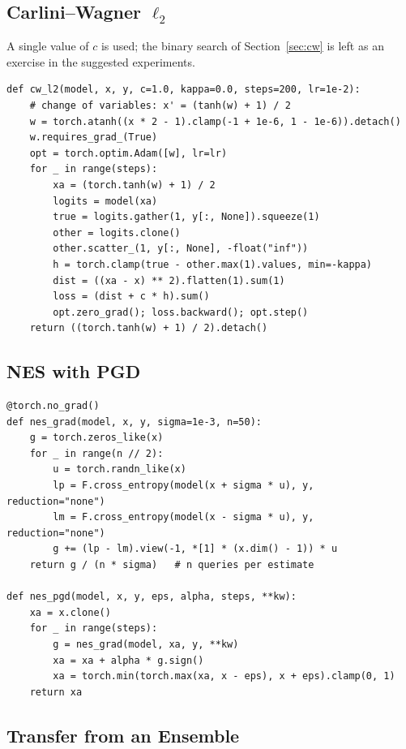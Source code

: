 \documentclass[10pt,a4paper]{extarticle}
\theoremstyle{definition}
\begin{document}
\subsection{Carlini--Wagner \(\ell_2\)}

A single value of \(c\) is used; the binary search of Section~\ref{sec:cw} is left as an exercise in the suggested experiments.

\begin{lstlisting}
def cw_l2(model, x, y, c=1.0, kappa=0.0, steps=200, lr=1e-2):
    # change of variables: x' = (tanh(w) + 1) / 2
    w = torch.atanh((x * 2 - 1).clamp(-1 + 1e-6, 1 - 1e-6)).detach()
    w.requires_grad_(True)
    opt = torch.optim.Adam([w], lr=lr)
    for _ in range(steps):
        xa = (torch.tanh(w) + 1) / 2
        logits = model(xa)
        true = logits.gather(1, y[:, None]).squeeze(1)
        other = logits.clone()
        other.scatter_(1, y[:, None], -float("inf"))
        h = torch.clamp(true - other.max(1).values, min=-kappa)
        dist = ((xa - x) ** 2).flatten(1).sum(1)
        loss = (dist + c * h).sum()
        opt.zero_grad(); loss.backward(); opt.step()
    return ((torch.tanh(w) + 1) / 2).detach()
\end{lstlisting}

\subsection{NES with PGD}

\begin{lstlisting}
@torch.no_grad()
def nes_grad(model, x, y, sigma=1e-3, n=50):
    g = torch.zeros_like(x)
    for _ in range(n // 2):
        u = torch.randn_like(x)
        lp = F.cross_entropy(model(x + sigma * u), y, reduction="none")
        lm = F.cross_entropy(model(x - sigma * u), y, reduction="none")
        g += (lp - lm).view(-1, *[1] * (x.dim() - 1)) * u
    return g / (n * sigma)   # n queries per estimate

def nes_pgd(model, x, y, eps, alpha, steps, **kw):
    xa = x.clone()
    for _ in range(steps):
        g = nes_grad(model, xa, y, **kw)
        xa = xa + alpha * g.sign()
        xa = torch.min(torch.max(xa, x - eps), x + eps).clamp(0, 1)
    return xa
\end{lstlisting}

\subsection{Transfer from an Ensemble}
\end{document}
